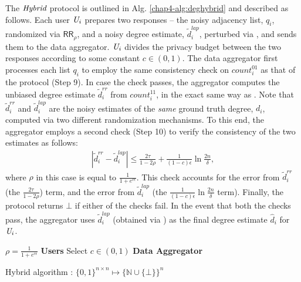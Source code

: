 The $\textit{Hybrid}$ protocol is outlined in Alg. \ref{chap4-alg:deghybrid} and described as follows. Each user $\textit{U}_i$ prepares two responses -- the noisy adjacency list, $q_i$, randomized via $\textsf{RR}_{\rho}$, and a noisy degree estimate, $\tilde{d}^{lap}_i$, perturbed via \RLap, and sends them to the data aggregator. $\textit{U}_i$ divides the privacy budget between the two responses according to some constant $c \in (0,1)$. The data aggregator first processes each list $q_i$ to employ the same consistency check on $count^{01}_i$ as that of the \DegRRCheck{} protocol (Step 9).
In case the check passes, the aggregator computes the unbiased degree estimate $\tilde{d}^{rr}_i$ from $count_i^{11}$, in the exact same way as \DegRRCheck. Note that $\tilde{d}^{rr}_i$ and $\tilde{d}^{lap}_i$ are the noisy estimates of the \textit{same} ground truth degree, $d_i$, computed via two different randomization mechanisms. To this end, the aggregator employs a second check (Step 10) to verify the consistency of the two estimates as follows:
\begin{gather*} |\tilde{d}_i^{rr} - \tilde{d}_i^{lap}| \leq \frac{2\tau}{1-2\rho} + \frac{1}{(1-c)\epsilon}\ln \tfrac{2n}{\delta} ,\end{gather*} 
where $\rho$ in this case is equal to $\frac{1}{1+e^{c\epsilon}}$.
This check accounts for the error from $\tilde{d}^{rr}_i$ (the $\frac{2\tau}{1-2\rho}$) term, and the error from $\tilde{d}^{lap}_i$ (the $\frac{1}{(1-c)\epsilon}\ln \tfrac{2n}{\delta}$ term).
Finally, the protocol returns $\bot$ if either of the checks fail.
In the event that both the checks pass, the aggregator uses $\tilde{d}_i^{lap}$ (obtained via \RLap) as the final degree estimate $\hat{d}_i$ for $\textit{U}_i$.

\begin{algorithm}[t]
%  
  $\rho=\frac{1}{1+e^{c\epsilon}}$\;
  \textbf{Users}\;
  Select $c\in (0,1)$\;
  \textbf{Data Aggregator}\;
  \caption[Hybrid algorithm \DegHybrid.]{Hybrid algorithm \DegHybrid: $\{0,1\}^{n\times n}\mapsto \{\mathbb{N}\cup \{\bot\}\}^n$}\label{chap4-alg:deghybrid}
\end{algorithm}

